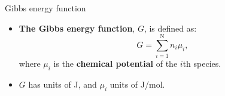 %
\begin{frame}{Gibbs energy function}

\begin{itemize}
\item 
\textbf{The Gibbs energy function}, $G$, is defined as: 
\[
\boxed{
G=\sum_{i=1}^{\text{N}}n_{i}\mu_{i},
}
\]
where $\mu_{i}$ is the \alert{\bf chemical potential} of the $i$th
species. \\[30pt]
\item $G$ has units of J, and $\mu_{i}$ units of J/mol.
\end{itemize}
\end{frame}
%
%
